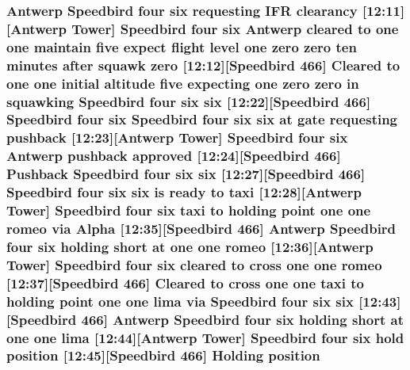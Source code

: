 \subsubsection[{\texorpdfstring{position}{position}}]{\setlength{\rightskip}{0pt plus 5cm}Antwerp Speedbird four {\bf six} requesting I\+FR clearancy \mbox{[}12\+:11\mbox{]}\mbox{[}Antwerp {\bf Tower}\mbox{]} Speedbird four {\bf six} Antwerp cleared to {\bf one} {\bf one} maintain five expect flight level {\bf one} {\bf zero} {\bf zero} {\bf ten} minutes after squawk {\bf zero} \mbox{[}12\+:12\mbox{]}\mbox{[}Speedbird 466\mbox{]} Cleared to {\bf one} {\bf one} initial altitude five expecting {\bf one} {\bf zero} {\bf zero} in {\bf squawking} Speedbird four {\bf six} {\bf six} \mbox{[}12\+:22\mbox{]}\mbox{[}Speedbird 466\mbox{]} Speedbird four {\bf six} Speedbird four {\bf six} {\bf six} at gate requesting pushback \mbox{[}12\+:23\mbox{]}\mbox{[}Antwerp {\bf Tower}\mbox{]} Speedbird four {\bf six} Antwerp pushback {\bf approved} \mbox{[}12\+:24\mbox{]}\mbox{[}Speedbird 466\mbox{]} Pushback Speedbird four {\bf six} {\bf six} \mbox{[}12\+:27\mbox{]}\mbox{[}Speedbird 466\mbox{]} Speedbird four {\bf six} {\bf six} is ready to taxi \mbox{[}12\+:28\mbox{]}\mbox{[}Antwerp {\bf Tower}\mbox{]} Speedbird four {\bf six} taxi to holding point {\bf one} {\bf one} {\bf romeo} via {\bf Alpha} \mbox{[}12\+:35\mbox{]}\mbox{[}Speedbird 466\mbox{]} Antwerp Speedbird four {\bf six} holding short at {\bf one} {\bf one} {\bf romeo} \mbox{[}12\+:36\mbox{]}\mbox{[}Antwerp {\bf Tower}\mbox{]} Speedbird four {\bf six} cleared to cross {\bf one} {\bf one} {\bf romeo} \mbox{[}12\+:37\mbox{]}\mbox{[}Speedbird 466\mbox{]} Cleared to cross {\bf one} {\bf one} taxi to holding point {\bf one} {\bf one} {\bf lima} via Speedbird four {\bf six} {\bf six} \mbox{[}12\+:43\mbox{]}\mbox{[}Speedbird 466\mbox{]} Antwerp Speedbird four {\bf six} holding short at {\bf one} {\bf one} {\bf lima} \mbox{[}12\+:44\mbox{]}\mbox{[}Antwerp {\bf Tower}\mbox{]} Speedbird four {\bf six} hold position \mbox{[}12\+:45\mbox{]}\mbox{[}Speedbird 466\mbox{]} Holding position}\hypertarget{happyDay4ATC_8txt_adfd9ba164d3d89874d56c97b672d9b6c}{}\label{happyDay4ATC_8txt_adfd9ba164d3d89874d56c97b672d9b6c}
